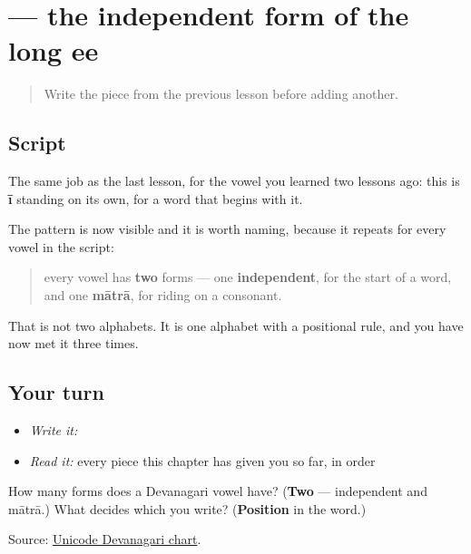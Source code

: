\section[\texorpdfstring{\hi{ई} (ī)}{ई (ī)}]{ — the independent form of the long ee}

\label{lesson:HI-W12-ii}



\begin{quote}
Write the piece from the previous lesson before adding another.
\end{quote}

\subsection*{Script}

\begin{quote}
\end{quote}

The same job as the last lesson, for the vowel you learned two lessons ago: this is \textbf{ī} standing on its own, for a word that begins with it.

The pattern is now visible and it is worth naming, because it repeats for every vowel in the script:

\begin{quote}
every vowel has \textbf{two} forms — one \textbf{independent}, for the start of a word, and one \textbf{mātrā}, for riding on a consonant.
\end{quote}

That is not two alphabets. It is one alphabet with a positional rule, and you have now met it three times.

\subsection*{Your turn}
\begin{itemize}
\raggedright
  \item \emph{Write it:} 
  \item \emph{Read it:} every piece this chapter has given you so far, in order
\end{itemize}

\begin{tcolorbox}[breakable,colback=teal!4,colframe=teal!35!black,title={Before you move on}]
How many forms does a Devanagari vowel have? (\textbf{Two} — independent and mātrā.) What decides which you write? (\textbf{Position} in the word.)

Source: \href{https://www.unicode.org/charts/PDF/U0900.pdf}{Unicode Devanagari chart}.
\end{tcolorbox}
